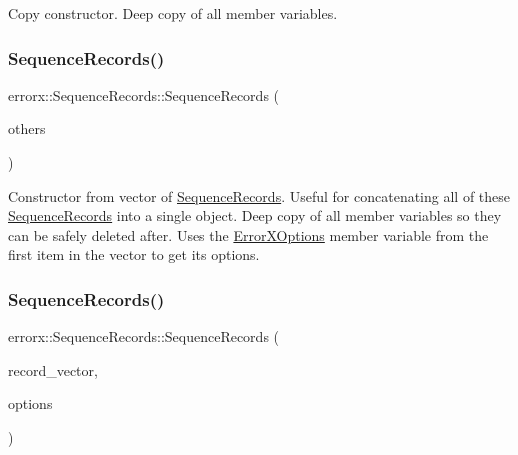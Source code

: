 Copy constructor. Deep copy of all member variables. \mbox{\label{classerrorx_1_1_sequence_records_a0c868ff30175b97b01beb6239d432603}} 
\subsubsection{\texorpdfstring{Sequence\+Records()}{SequenceRecords()}\hspace{0.1cm}{\footnotesize\ttfamily [3/4]}}
{\footnotesize\ttfamily errorx\+::\+Sequence\+Records\+::\+Sequence\+Records (\begin{DoxyParamCaption}\item[{vector$<$ \mbox{\hyperlink{classerrorx_1_1_sequence_records}{Sequence\+Records}} $\ast$$>$ const \&}]{others }\end{DoxyParamCaption})}

Constructor from vector of \mbox{\hyperlink{classerrorx_1_1_sequence_records}{Sequence\+Records}}. Useful for concatenating all of these \mbox{\hyperlink{classerrorx_1_1_sequence_records}{Sequence\+Records}} into a single object. Deep copy of all member variables so they can be safely deleted after. Uses the \mbox{\hyperlink{classerrorx_1_1_error_x_options}{Error\+X\+Options}} member variable from the first item in the vector to get its options. \mbox{\label{classerrorx_1_1_sequence_records_aa5056e29e388a8cc013d304448029a82}} 
\subsubsection{\texorpdfstring{Sequence\+Records()}{SequenceRecords()}\hspace{0.1cm}{\footnotesize\ttfamily [4/4]}}
{\footnotesize\ttfamily errorx\+::\+Sequence\+Records\+::\+Sequence\+Records (\begin{DoxyParamCaption}\item[{vector$<$ \mbox{\hyperlink{classerrorx_1_1_sequence_record}{Sequence\+Record}} $\ast$$>$ const \&}]{record\+\_\+vector,  }\item[{\mbox{\hyperlink{classerrorx_1_1_error_x_options}{Error\+X\+Options}} const \&}]{options }\end{DoxyParamCaption})}

